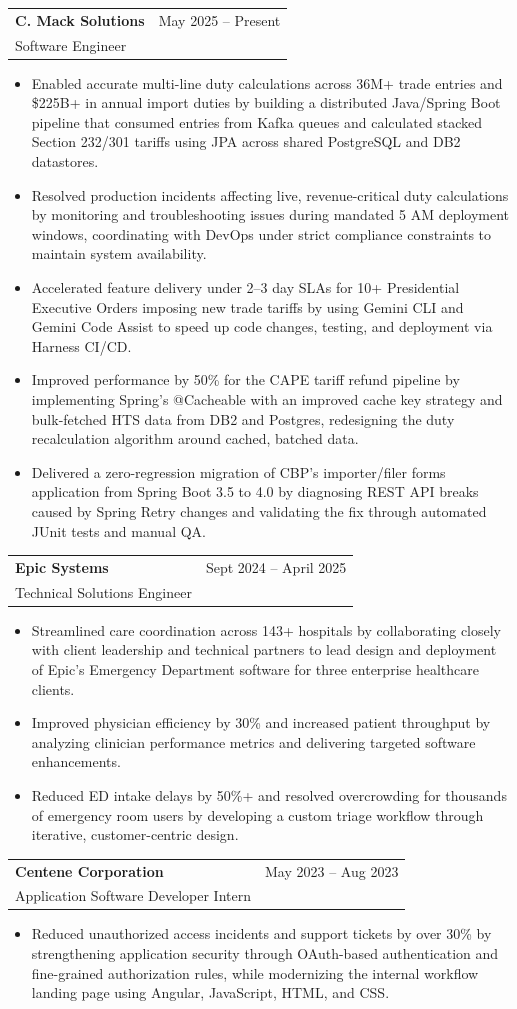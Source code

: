 \documentclass[letterpaper,11pt]{article}
\makeatletter
\newcommand{\resumeItem}[1]{
  \item\small{
    {#1 \vspace{-2pt}}
  }
}
\newcommand{\resumeSubheading}[4]{
  \vspace{-1pt}\item
    \begin{tabular*}{0.97\textwidth}[t]{l@{\extracolsep{\fill}}r}
      \textbf{#1} & #2 \\
      #3 & \textit{\small #4} \\
    \end{tabular*}\vspace{-5pt}
}
\newcommand{\resumeItemListStart}{\begin{itemize}[itemsep=-1pt]}
\newcommand{\resumeItemListEnd}{\end{itemize}\vspace{-4pt}}
\makeatother
\begin{document}
    \resumeSubheading
      {C. Mack Solutions}{May 2025 -- Present}
      {Software Engineer}{}
      \resumeItemListStart
        \resumeItem{Enabled accurate multi-line duty calculations across 36M+ trade entries and \$225B+ in annual import duties by building a distributed Java/Spring Boot pipeline that consumed entries from Kafka queues and calculated stacked Section 232/301 tariffs using JPA across shared PostgreSQL and DB2 datastores.}
        \resumeItem{Resolved production incidents affecting live, revenue-critical duty calculations by monitoring and troubleshooting issues during mandated 5 AM deployment windows, coordinating with DevOps under strict compliance constraints to maintain system availability.}
        \resumeItem{Accelerated feature delivery under 2--3 day SLAs for 10+ Presidential Executive Orders imposing new trade tariffs by using Gemini CLI and Gemini Code Assist to speed up code changes, testing, and deployment via Harness CI/CD.}
        \resumeItem{Improved performance by 50\% for the CAPE tariff refund pipeline by implementing Spring's @Cacheable with an improved cache key strategy and bulk-fetched HTS data from DB2 and Postgres, redesigning the duty recalculation algorithm around cached, batched data.}
        \resumeItem{Delivered a zero-regression migration of CBP's importer/filer forms application from Spring Boot 3.5 to 4.0 by diagnosing REST API breaks caused by Spring Retry changes and validating the fix through automated JUnit tests and manual QA.}
      \resumeItemListEnd

    \resumeSubheading
      {Epic Systems}{Sept 2024 -- April 2025}
      {Technical Solutions Engineer}{}
      \resumeItemListStart
        \resumeItem{Streamlined care coordination across 143+ hospitals by collaborating closely with client leadership and technical partners to lead design and deployment of Epic's Emergency Department software for three enterprise healthcare clients.}
        \resumeItem{Improved physician efficiency by 30\% and increased patient throughput by analyzing clinician performance metrics and delivering targeted software enhancements.}
        \resumeItem{Reduced ED intake delays by 50\%+ and resolved overcrowding for thousands of emergency room users by developing a custom triage workflow through iterative, customer-centric design.}
      \resumeItemListEnd

    \resumeSubheading
      {Centene Corporation}{May 2023 -- Aug 2023}
      {Application Software Developer Intern}{}
      \resumeItemListStart
        \resumeItem{Reduced unauthorized access incidents and support tickets by over 30\% by strengthening application security through OAuth-based authentication and fine-grained authorization rules, while modernizing the internal workflow landing page using Angular, JavaScript, HTML, and CSS.}
      \resumeItemListEnd
\end{document}
